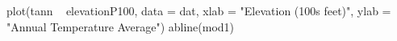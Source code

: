\begin{Schunk}
\begin{Sinput}
 plot(tann ~ elevationP100, data = dat, xlab = "Elevation (100s feet)", ylab = "Annual Temperature Average")
 abline(mod1)
\end{Sinput}
\end{Schunk}
